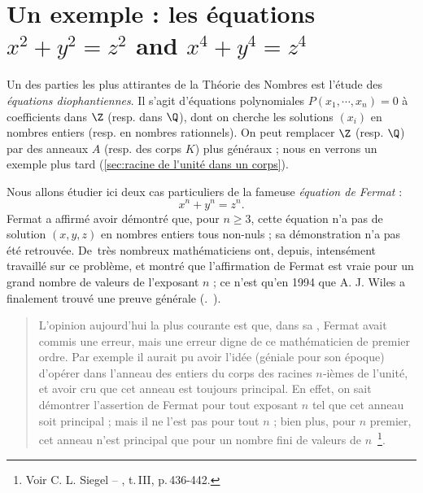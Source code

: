 \documentclass[11pt, useosf,
  title in boldface,
  theorem in new line,
  theorem numbering = section,
  number theorems separately,
]{simplivre}
\begin{document}
\section{Un exemple : les équations \texorpdfstring{\( x^2 + y^2 = z^2 \)}{x\textasciicircum 2+y\textasciicircum 2=z\textasciicircum 2} and \texorpdfstring{\( x^4 + y^4 = z^4 \)}{x\textasciicircum 4+y\textasciicircum 4=z\textasciicircum 4}}\label{sec:l'équation de Fermat;cas 2 et 4}

    Un des parties les plus attirantes de la Théorie des Nombres est l'étude des \emph{équations diophantiennes}. Il s'agit d'équations polynomiales \( P(x_1, \cdots, x_n) = 0 \) à coefficients dans \( \Z \) (resp. dans \( \Q \)), dont on cherche les solutions \( (x_i) \) en nombres entiers (resp. en nombres rationnels). On peut remplacer \( \Z \) (resp. \( \Q \)) par des anneaux \( A \) (resp. des corps \( K \)) plus généraux ; nous en verrons un exemple plus tard (\cref{sec:racine de l'unité dans un corps}).

    Nous allons étudier ici deux cas particuliers de la fameuse \emph{équation de Fermat} :
    \begin{equation}
        x^n+y^n=z^n.\label{eq:fermat}
    \end{equation}
    Fermat a affirmé avoir démontré que, pour \( n \geqslant 3 \), cette équation n'a pas de solution \( (x,y,z) \) en nombres entiers tous non-nuls ; sa démonstration n'a pas été retrouvée. De~très nombreux mathématiciens ont, depuis, intensément travaillé sur ce problème, et montré que l'affirmation de Fermat est vraie pour un grand nombre de valeurs de l'exposant \( n \) ; ce n'est qu'en 1994 que A. J. Wiles a finalement trouvé une preuve générale (\cf.~\cite{wiles1994}).

    \begin{quote}
        L'opinion aujourd'hui la plus courante est que, dans sa , Fermat avait commis une erreur, mais une erreur digne de ce mathématicien de premier ordre. Par exemple il aurait pu avoir l'idée (géniale pour son époque) d'opérer dans l'anneau des entiers du corps des racines \( n \)‑ièmes de l'unité, et avoir cru que cet anneau est toujours principal. En effet, on sait démontrer l'assertion de Fermat pour tout exposant \( n \) tel que cet anneau soit principal ; mais il ne l'est pas pour tout \( n \) ; bien plus, pour \( n \) premier, cet anneau n'est principal que pour un nombre fini de valeurs de \( n \)~\footnote{Voir C. L. Siegel -- , t.\,III, p.\,436-442.}.
    \end{quote}
\end{document}
